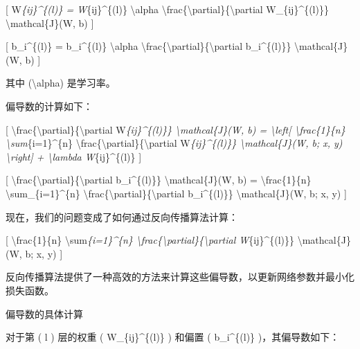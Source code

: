 {[} W\emph{\{ij\}\^{}\{(l)\} = W}\{ij\}\^{}\{(l)\} \textbackslash alpha
\textbackslash frac\{\textbackslash partial\}\{\textbackslash partial
W\_\{ij\}\^{}\{(l)\}\} \textbackslash mathcal\{J\}(W, b) {]}

{[} b\_i\^{}\{(l)\} = b\_i\^{}\{(l)\} \textbackslash alpha
\textbackslash frac\{\textbackslash partial\}\{\textbackslash partial
b\_i\^{}\{(l)\}\} \textbackslash mathcal\{J\}(W, b) {]}


其中 (\textbackslash alpha) 是学习率。

偏导数的计算如下：

{[}
\textbackslash frac\{\textbackslash partial\}\{\textbackslash partial
W\emph{\{ij\}\^{}\{(l)\}\} \textbackslash mathcal\{J\}(W, b) =
\textbackslash left{[} \textbackslash frac\{1\}\{n\}
\textbackslash sum}\{i=1\}\^{}\{n\}
\textbackslash frac\{\textbackslash partial\}\{\textbackslash partial
W\emph{\{ij\}\^{}\{(l)\}\} \textbackslash mathcal\{J\}(W, b; x, y)
\textbackslash right{]} + \textbackslash lambda W}\{ij\}\^{}\{(l)\} {]}

{[}
\textbackslash frac\{\textbackslash partial\}\{\textbackslash partial
b\_i\^{}\{(l)\}\} \textbackslash mathcal\{J\}(W, b) =
\textbackslash frac\{1\}\{n\} \textbackslash sum\_\{i=1\}\^{}\{n\}
\textbackslash frac\{\textbackslash partial\}\{\textbackslash partial
b\_i\^{}\{(l)\}\} \textbackslash mathcal\{J\}(W, b; x, y) {]}


现在，我们的问题变成了如何通过反向传播算法计算：

{[} \textbackslash frac\{1\}\{n\}
\textbackslash sum\emph{\{i=1\}\^{}\{n\}
\textbackslash frac\{\textbackslash partial\}\{\textbackslash partial
W}\{ij\}\^{}\{(l)\}\} \textbackslash mathcal\{J\}(W, b; x, y) {]}


反向传播算法提供了一种高效的方法来计算这些偏导数，以更新网络参数并最小化损失函数。

偏导数的具体计算

对于第 ( l ) 层的权重 ( W\_\{ij\}\^{}\{(l)\} ) 和偏置 ( b\_i\^{}\{(l)\}
)，其偏导数如下：

